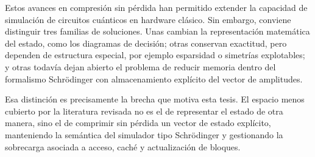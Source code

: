 Estos avances en compresión sin pérdida han permitido extender la capacidad de
simulación de circuitos cuánticos en hardware clásico. Sin embargo, conviene distinguir
tres familias de soluciones. Unas cambian la representación matemática del estado, como
los diagramas de decisión; otras conservan exactitud, pero dependen de estructura
especial, por ejemplo esparsidad o simetrías explotables; y otras todavía dejan abierto el
problema de reducir memoria dentro del formalismo Schr\"odinger con almacenamiento
explícito del vector de amplitudes.

Esa distinción es precisamente la brecha que motiva esta tesis. El espacio menos cubierto
por la literatura revisada no es el de representar el estado de otra manera, sino el de
comprimir sin pérdida un vector de estado explícito, manteniendo la semántica del
simulador tipo Schr\"odinger y gestionando la sobrecarga asociada a acceso, caché y
actualización de bloques.
